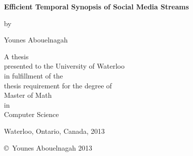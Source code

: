 \pagestyle{empty}

\begin{titlepage}
        \begin{center}
        \vspace*{1.0cm}

        \Huge
        {\bf Efficient Temporal Synopsis of Social Media Streams }

        \vspace*{1.0cm}

        \normalsize
        by \\

        \vspace*{1.0cm}

        \Large
       Younes Abouelnagah\\

        \vspace*{3.0cm}

        \normalsize
        A thesis \\
        presented to the University of Waterloo \\ 
        in fulfillment of the \\
        thesis requirement for the degree of \\
        Master of Math \\
        in \\
        Computer Science \\

        \vspace*{2.0cm}

        Waterloo, Ontario, Canada, 2013 \\

        \vspace*{1.0cm}

        \copyright\ Younes Abouelnagah 2013 \\
        \end{center}
\end{titlepage}

\pagestyle{plain}
\setcounter{page}{2}

